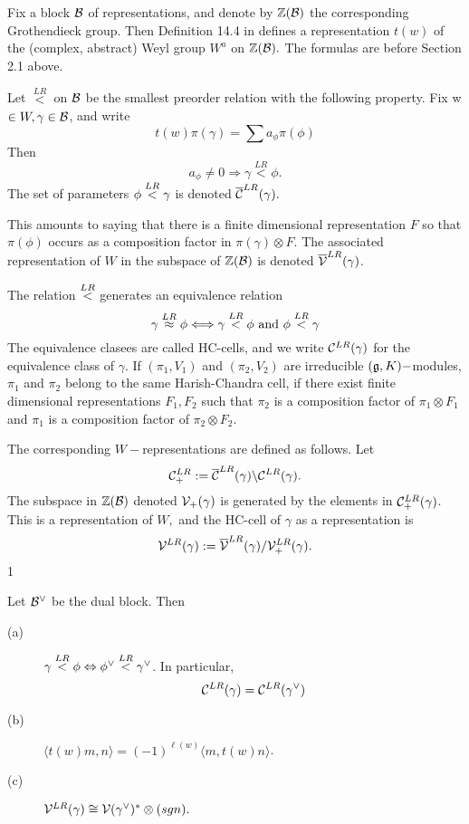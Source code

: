\documentclass[11pt ,reqno]{amsart}
\begin{document}
Fix a block ${\mathcal B}$ of representations, and denote by ${\mathbb Z}({\mathcal B})$ the corresponding
Grothendieck group. Then Definition 14.4 in \cite{V4} defines a
representation $t(w)$ of the (complex, abstract) Weyl group $W^a$ on ${\mathbb Z}({\mathcal B}).$
The formulas are before Section 2.1 above.
\begin{definition}[14.6 in \cite{V4}]
 Let  $\overset{LR}{<}$ on ${\mathcal B}$ be the smallest preorder relation with the following
property.  Fix  w$\in W, \gamma\in {\mathcal B}$, and write
$$
t(w)\pi(\gamma)=\sum a_\phi\pi(\phi)
$$
Then 
$$
a_\phi\ne 0 \Longrightarrow \gamma \overset{LR}{<}\phi.
$$
The set of parameters $\phi\overset{LR}{<} \gamma$ is denoted $\overline{{\mathcal C}}^{LR}(\gamma).$
\end{definition}
This amounts to saying that there is a finite dimensional
representation $F$ so that $\pi(\phi)$ occurs as a composition factor
in $\pi(\gamma)\otimes F.$
The associated representation of $W$ in the subspace of ${\mathbb Z}({\mathcal B})$ is
denoted $\overline{{\mathcal V}}^{LR}(\gamma)$.

The relation $\overset{LR}{<}$ generates an equivalence relation 
$$
\gamma\overset{LR}{\approx} \phi \Longleftrightarrow \gamma\overset{LR}{<}\phi \text{ and } \phi \overset{LR}{<}\gamma
$$
The equivalence clasees are called HC-cells, and we write ${\mathcal C}^{LR}(\gamma)$ for the equivalence class of $\gamma$. If $(\pi_1,V_1)$ and $(\pi_2,V_2)$ are irreducible $({\mathfrak{g}},K)-$modules,  $\pi_1$ and $\pi_2$ belong to the same
  Harish-Chandra cell, if there exist finite dimensional
  representations $F_1, F_2$ such that $\pi_2$ is a composition factor
  of $\pi_1\otimes F_1$ and $\pi_1$ is a composition factor of
  $\pi_2\otimes F_2.$ 

  The corresponding $W-$representations are defined as follows. Let
  $$
  {\mathcal C}_+^{LR}:=\overline{{\mathcal C}}^{LR}(\gamma)\backslash {\mathcal C}^{LR}(\gamma).
$$
The subspace in ${\mathbb Z}({\mathcal B})$ denoted ${\mathcal V}_+(\gamma)$ is generated by the elements
in ${\mathcal C}_+^{LR}(\gamma)$. This  is a representation of $W,$ and the HC-cell
of $\gamma$ as a representation is  
$$
{\mathcal V}^{LR}(\gamma):={\overline{{\mathcal V}}}^{LR}(\gamma)/{\mathcal V}_+^{LR}(\gamma).
$$1

\begin{proposition}
  Let ${\mathcal B}^\vee$ be the dual block. Then
  \begin{description} 
  \item[(a)] $\gamma\overset{LR}{<} \phi \Leftrightarrow \phi^\vee\overset{LR}{<}
    \gamma^\vee$. In particular,
    $$
    { {\mathcal C}^{LR}(\gamma)={\mathcal C}^{LR}(\gamma^\vee)}
    $$
  \item[(b)] $\langle t(w)m,n\rangle =(-1)^{\ell(w)}\langle m,t(w)n\rangle$.
\item[(c)] { ${\mathcal V}^{LR}(\gamma)\cong {\mathcal V}(\gamma^\vee)^*\otimes (sgn).$}    
  \end{description}  
\end{proposition}
\end{document}
